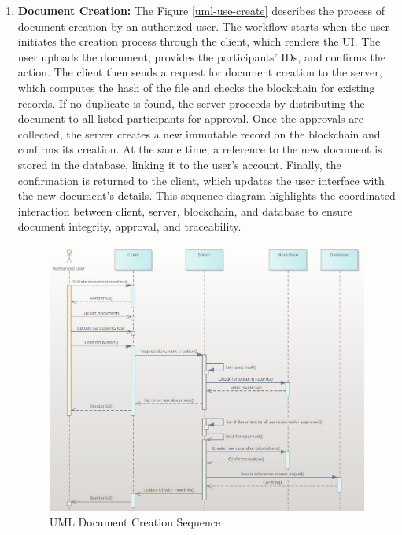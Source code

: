 \begin{enumerate}
    \item \textbf{Document Creation:} The Figure \ref{uml-use-create} describes the process of document creation by an authorized user. The workflow starts when the user initiates the creation process through the client, which renders the UI. The user uploads the document, provides the participants’ IDs, and confirms the action. The client then sends a request for document creation to the server, which computes the hash of the file and checks the blockchain for existing records. If no duplicate is found, the server proceeds by distributing the document to all listed participants for approval. Once the approvals are collected, the server creates a new immutable record on the blockchain and confirms its creation. At the same time, a reference to the new document is stored in the database, linking it to the user’s account. Finally, the confirmation is returned to the client, which updates the user interface with the new document’s details. This sequence diagram highlights the coordinated interaction between client, server, blockchain, and database to ensure document integrity, approval, and traceability.
    \begin{figure}[H]
        \centering
        \includegraphics[width=18cm]{"images/umlDiagrams/uml-sequence-create.png"}
        \caption{UML Document Creation Sequence}
        \label{uml-sequence-create}
    \end{figure}


\end{enumerate}
